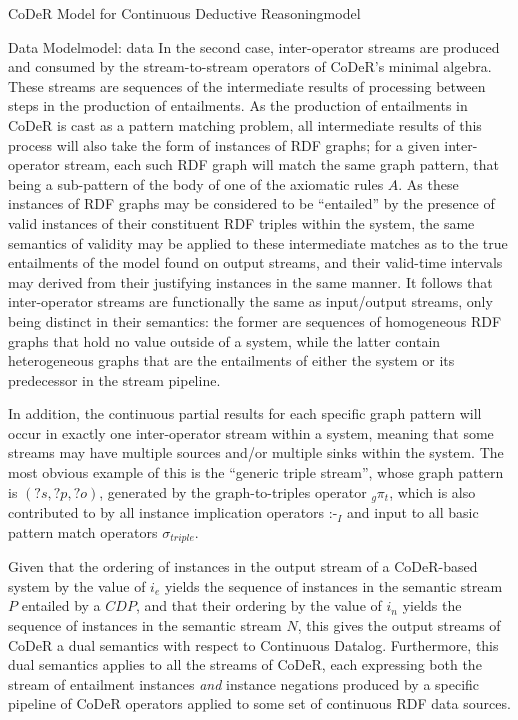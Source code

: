 \begin{nestedsection}{CoDeR Model for Continuous Deductive Reasoning}{model}
\begin{nestedsection}{Data Model}{model: data}
		In the second case, inter-operator streams are produced and consumed by the stream-to-stream operators of CoDeR's minimal algebra.
		These streams are sequences of the intermediate results of processing between steps in the production of entailments.
		As the production of entailments in CoDeR is cast as a pattern matching problem, all intermediate results of this process will also take the form of instances of RDF graphs;
		for a given inter-operator stream, each such RDF graph will match the same graph pattern, that being a sub-pattern of the body of one of the axiomatic rules $A$.
		As these instances of RDF graphs may be considered to be ``entailed'' by the presence of valid instances of their constituent RDF triples within the system, the same semantics of validity may be applied to these intermediate matches as to the true entailments of the model found on output streams, and their valid-time intervals may derived from their justifying instances in the same manner.
		It follows that inter-operator streams are functionally the same as input/output streams, only being distinct in their semantics:
		the former are sequences of homogeneous RDF graphs that hold no value outside of a system, while the latter contain heterogeneous graphs that are the entailments of either the system or its predecessor in the stream pipeline.

		In addition, the continuous partial results for each specific graph pattern will occur in exactly one inter-operator stream within a system, meaning that some streams may have multiple sources and/or multiple sinks within the system.
		The most obvious example of this is the ``generic triple stream'', whose graph pattern is ${(?s,?p,?o)}$, generated by the graph-to-triples operator ${{}_g\pi_t}$, which is also contributed to by all instance implication operators $\text{:-}_I$ and input to all basic pattern match operators $\sigma_{triple}$.

		Given that the ordering of instances in the output stream of a CoDeR-based system by the value of $i_{e}$ yields the sequence of instances in the semantic stream $P$ entailed by a ${CDP}$, and that their ordering by the value of $i_{n}$ yields the sequence of instances in the semantic stream $N$, this gives the output streams of CoDeR a dual semantics with respect to Continuous Datalog.
		Furthermore, this dual semantics applies to all the streams of CoDeR, each expressing both the stream of entailment instances \emph{and} instance negations produced by a specific pipeline of CoDeR operators applied to some set of continuous RDF data sources.
	\end{nestedsection}


\end{nestedsection}
